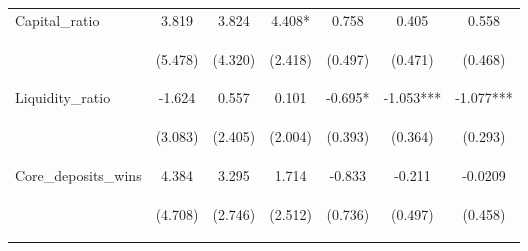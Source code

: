 \documentclass[]{article}
\begin{document}
\begin{center}
\begin{tabular}{lcccccc}
Capital\_ratio & 3.819 & 3.824 & 4.408* & 0.758 & 0.405 & 0.558 \\
\vspace{4pt} & \begin{footnotesize}(5.478)\end{footnotesize} & \begin{footnotesize}(4.320)\end{footnotesize} & \begin{footnotesize}(2.418)\end{footnotesize} & \begin{footnotesize}(0.497)\end{footnotesize} & \begin{footnotesize}(0.471)\end{footnotesize} & \begin{footnotesize}(0.468)\end{footnotesize} \\
Liquidity\_ratio & -1.624 & 0.557 & 0.101 & -0.695* & -1.053*** & -1.077*** \\
\vspace{4pt} & \begin{footnotesize}(3.083)\end{footnotesize} & \begin{footnotesize}(2.405)\end{footnotesize} & \begin{footnotesize}(2.004)\end{footnotesize} & \begin{footnotesize}(0.393)\end{footnotesize} & \begin{footnotesize}(0.364)\end{footnotesize} & \begin{footnotesize}(0.293)\end{footnotesize} \\
Core\_deposits\_wins & 4.384 & 3.295 & 1.714 & -0.833 & -0.211 & -0.0209 \\
\vspace{4pt} & \begin{footnotesize}(4.708)\end{footnotesize} & \begin{footnotesize}(2.746)\end{footnotesize} & \begin{footnotesize}(2.512)\end{footnotesize} & \begin{footnotesize}(0.736)\end{footnotesize} & \begin{footnotesize}(0.497)\end{footnotesize} & \begin{footnotesize}(0.458)\end{footnotesize} \\

\end{tabular}
\end{center}
\end{document}
